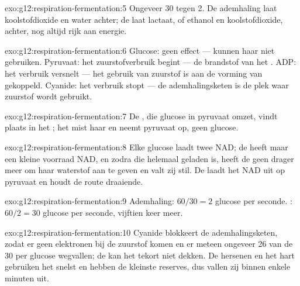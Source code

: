\begin{solution}{exo:g12:respiration-fermentation:5}
Ongeveer 30  tegen 2. De ademhaling laat koolstofdioxide en water
achter; de  laat lactaat, of ethanol en koolstofdioxide, achter,
nog altijd rijk aan energie.
\end{solution}

\begin{solution}{exo:g12:respiration-fermentation:6}
Glucose: geen effect ---  kunnen haar niet gebruiken.
Pyruvaat: het zuurstofverbruik begint --- de brandstof van het
. ADP: het verbruik versnelt --- het gebruik van zuurstof is
aan de vorming van  gekoppeld. Cyanide: het verbruik stopt --- de
ademhalingsketen is de plek waar zuurstof wordt gebruikt.
\end{solution}

\begin{solution}{exo:g12:respiration-fermentation:7}
De , die glucose in pyruvaat omzet, vindt plaats in het
; het  mist haar  en neemt pyruvaat op, geen
glucose.
\end{solution}

\begin{solution}{exo:g12:respiration-fermentation:8}
Elke glucose laadt twee NAD; de  heeft maar een kleine voorraad NAD, en
zodra die helemaal geladen is, heeft de  geen drager meer om haar
waterstof aan te geven en valt zij stil. De  laadt het NAD uit op
pyruvaat en houdt de route draaiende.
\end{solution}

\begin{solution}{exo:g12:respiration-fermentation:9}
Ademhaling: $60/30 = 2$ glucose per seconde. : $60/2 = 30$
glucose per seconde, vijftien keer meer.
\end{solution}

\begin{solution}{exo:g12:respiration-fermentation:10}
Cyanide blokkeert de ademhalingsketen, zodat er geen elektronen bij de
zuurstof komen en er meteen ongeveer 26 van de 30  per glucose
wegvallen; de  kan het tekort niet dekken. De hersenen en het hart
gebruiken het snelst  en hebben de kleinste reserves, dus vallen zij
binnen enkele minuten uit.
\end{solution}

